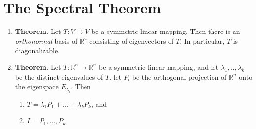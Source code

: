 \documentclass[oneside, 12pt]{book}
\newcommand{\settag}[1]{\renewcommand{\theenumi}{#1}}
\newcommand{\R}{\mathbb{R}}
\newcommand{\tbf}[1]{\textbf{#1}}
\newcommand{\trans}[3]{$#1:#2\rightarrow{}#3$}
\newcommand{\para}[1]{\item \tbf{#1}}
\begin{document}
\section{The Spectral Theorem}
\begin{enumerate}
    \settag{4.6.1}
    \para{Theorem.} Let \trans{T}{V}{V} be a symmetric linear mapping. Then there is an \textit{orthonormal} basis of $\R^n$ consisting of eigenvectors of $T$. In particular, $T$ is diagonalizable.
    
    \settag{4.6.3}
    \para{Theorem.} Let \trans{T}{\R^n}{\R^n} be a symmetric linear mapping, and let $\lambda_1,..,\lambda_k$ be the distinct eigenvalues of $T$. let $P_i$ be the orthogonal projection of $\R^n$ onto the eigenspace $E_{\lambda_i}$. Then
    \begin{enumerate}
        \item $T = \lambda_1P_1+...+\lambda_k P_k$, and
        \item $I = P_1,...,P_k$
    \end{enumerate}
\end{enumerate}
\end{document}

